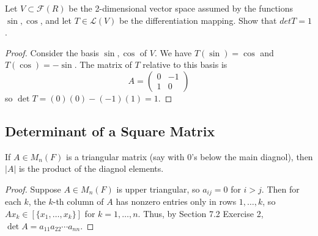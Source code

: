 \begin{tcolorbox}[title=Problem 4, breakable]
    Let $V \subset \mathcal{F}(R)$ be the 2-dimensional vector space assumed by the functions
    $\sin, \cos$, and let $T \in \mathcal{L}(V)$ be the differentiation mapping. Show that $det T = 1$.
\end{tcolorbox}

\begin{proof}
    Consider the basis $\sin, \cos$ of $V$.
    We have $T(\sin) = \cos$ and $T(\cos) = -\sin$.
    The matrix of $T$ relative to this basis is
    \[A = \begin{pmatrix} 0 & -1 \\ 1 & 0 \end{pmatrix}\]
    so $\det T = (0)(0) - (-1)(1) = 1$.
\end{proof}

\subsection{Determinant of a Square Matrix}

\begin{tcolorbox}[title=Problem 1, breakable]
    If $A \in M_n(F)$ is a triangular matrix (say with $0$'s below the main diagnol),
    then $|A|$ is the product of the diagnol elements.
\end{tcolorbox}

\begin{proof}
    Suppose $A \in M_n(F)$ is upper triangular, so $a_{ij} = 0$ for $i > j$.
    Then for each $k$, the $k$-th column of $A$ has nonzero entries only in rows $1, \ldots, k$,
    so $A x_k \in [\{x_1, \ldots, x_k\}]$ for $k = 1, \ldots, n$.
    Thus, by Section 7.2 Exercise 2, $\det A = a_{11} a_{22} \cdots a_{nn}$.
\end{proof}



